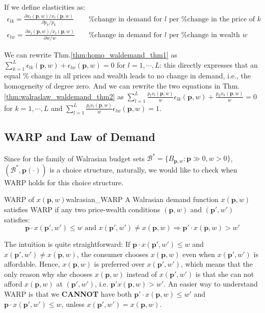 If we define elasticities as:
\begin{align*} 
    \epsilon_{lk}=\frac{\partial x_l(\mathbf{p},w)/x_l(\mathbf{p},w)}{\partial p_k /p_k} && \text{ \% change in demand for $l$ per \% change in the price of $k$} \\ 
    \epsilon_{lw}=\frac{\partial x_l(\mathbf{p},w)/x_l(\mathbf{p},w)}{\partial w/w} && \text{ \% change in demand for $l$ per \% change in wealth $w$}
\end{align*}

We can rewrite Thm.\ref{thm:homo_waldemand_thm1} as $\sum^L_{k=1}\epsilon_{lk}(\mathbf{p},w)+\epsilon_{lw}(\mathbf{p},w)=0$ for $l=1,\cdots,L$: this directly expresses that an equal \% change in all prices and wealth leads to no change in demand, i.e., the homogeneity of degree zero.
And we can rewrite the two equations in Thm.\ref{thm:walraslaw_waldemand_thm2} as $\sum^L_{l=1}\frac{p_lx_l(\mathbf{p},w)}{w}\epsilon_{lk}(\mathbf{p},w)+\frac{p_kx_k(\mathbf{p},w)}{w}=0$ for $k=1,\cdots,L$ and $\sum^L_{l=1}\frac{p_lx_l(\mathbf{p},w)}{w}\epsilon_{lw}(\mathbf{p},w)=1$.

\subsection{WARP and Law of Demand}\label{chap2:sec2:ssec3}
Since for the family of Walrasian budget sets $\mathcal{B}^*=\{B_{\mathbf{p},w}:\mathbf{p}\gg 0,w>0\}$, $(\mathcal{B}^*,\mathbf{p}(\cdot))$ is a choice structure, naturally, we would like to check when WARP holds for this choice structure.

\begin{definition}{WARP of $ x(\mathbf{p},w)$}{walrasian_WARP}
    A Walrasian demand function $ x(\mathbf{p},w)$ satisfies WARP if any two price-wealth conditions $(\mathbf{p},w)$ and $(\mathbf{p}',w')$ satisfies:
    $$\mathbf{p}\cdot  x(\mathbf{p}',w')\leq w\text{ and } x(\mathbf{p}',w')\neq  x(\mathbf{p},w)\Rightarrow \mathbf{p}'\cdot x(\mathbf{p},w)>w'$$
\end{definition}

The intuition is quite straightforward: If $\mathbf{p}\cdot  x(\mathbf{p}',w')\leq w$ and $ x(\mathbf{p}',w')\neq  x(\mathbf{p},w)$, the consumer chooses $ x(\mathbf{p},w)$ even when $ x(\mathbf{p}',w')$ is affordable. Hence, $ x(\mathbf{p},w)$ is preferred over $ x(\mathbf{p}',w')$, which means that the only reason why she chooses $ x(\mathbf{p},w)$ instead of $ x(\mathbf{p}',w')$ is that she can not afford $ x(\mathbf{p},w)$ at $(\mathbf{p}',w')$, i.e. $\mathbf{p}' x(\mathbf{p},w)>w'$. An easier way to understand WARP is that we \textbf{CANNOT} have both $\mathbf{p}'\cdot  x(\mathbf{p},w)\leq w'$ and $\mathbf{p}\cdot  x(\mathbf{p}',w')\leq w$, unless $ x(\mathbf{p}',w')= x(\mathbf{p},w)$.


